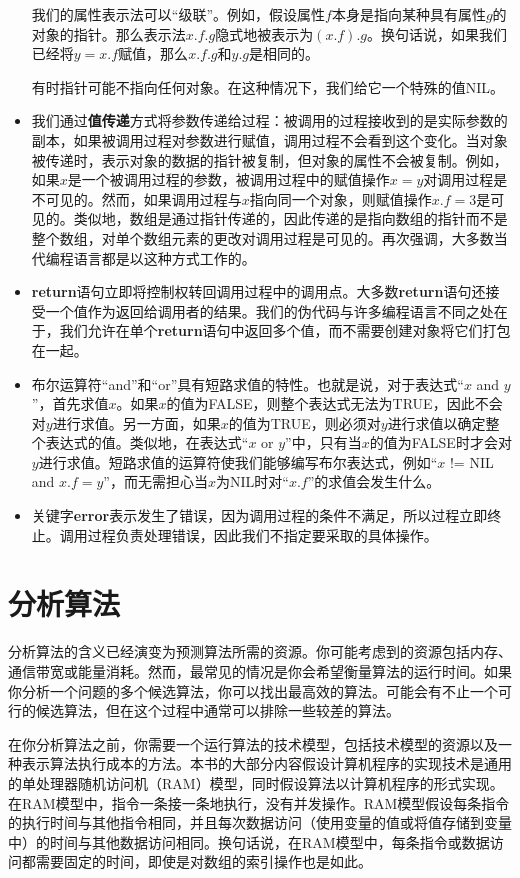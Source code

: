 \documentclass[lang=cn,newtx,10pt,scheme=chinese]{elegantbook}
\begin{document}
\begin{itemize}
    我们的属性表示法可以``级联''。例如，假设属性$f$本身是指向某种具有属性$g$的对象的指针。那么表示法$x.f.g$隐式地被表示为$(x.f).g$。换句话说，如果我们已经将$y = x.f$赋值，那么$x.f.g$和$y.g$是相同的。

    有时指针可能不指向任何对象。在这种情况下，我们给它一个特殊的值NIL。
    \item 我们通过\textbf{值传递}方式将参数传递给过程：被调用的过程接收到的是实际参数的副本，如果被调用过程对参数进行赋值，调用过程不会看到这个变化。当对象被传递时，表示对象的数据的指针被复制，但对象的属性不会被复制。例如，如果$x$是一个被调用过程的参数，被调用过程中的赋值操作$x=y$对调用过程是不可见的。然而，如果调用过程与$x$指向同一个对象，则赋值操作$x.f=3$是可见的。类似地，数组是通过指针传递的，因此传递的是指向数组的指针而不是整个数组，对单个数组元素的更改对调用过程是可见的。再次强调，大多数当代编程语言都是以这种方式工作的。
    \item \textbf{return}语句立即将控制权转回调用过程中的调用点。大多数\textbf{return}语句还接受一个值作为返回给调用者的结果。我们的伪代码与许多编程语言不同之处在于，我们允许在单个\textbf{return}语句中返回多个值，而不需要创建对象将它们打包在一起。
    \item 布尔运算符``and''和``or''具有短路求值的特性。也就是说，对于表达式``$x$ and $y$''，首先求值$x$。如果$x$的值为FALSE，则整个表达式无法为TRUE，因此不会对$y$进行求值。另一方面，如果$x$的值为TRUE，则必须对$y$进行求值以确定整个表达式的值。类似地，在表达式``$x$ or $y$''中，只有当$x$的值为FALSE时才会对$y$进行求值。短路求值的运算符使我们能够编写布尔表达式，例如``$x$ != NIL and $x.f=y$''，而无需担心当$x$为NIL时对``$x.f$''的求值会发生什么。
    \item 关键字\textbf{error}表示发生了错误，因为调用过程的条件不满足，所以过程立即终止。调用过程负责处理错误，因此我们不指定要采取的具体操作。
\end{itemize}

\section{分析算法}\label{section-2.2}

分析算法的含义已经演变为预测算法所需的资源。你可能考虑到的资源包括内存、通信带宽或能量消耗。然而，最常见的情况是你会希望衡量算法的运行时间。如果你分析一个问题的多个候选算法，你可以找出最高效的算法。可能会有不止一个可行的候选算法，但在这个过程中通常可以排除一些较差的算法。

在你分析算法之前，你需要一个运行算法的技术模型，包括技术模型的资源以及一种表示算法执行成本的方法。本书的大部分内容假设计算机程序的实现技术是通用的单处理器随机访问机（RAM）模型，同时假设算法以计算机程序的形式实现。在RAM模型中，指令一条接一条地执行，没有并发操作。RAM模型假设每条指令的执行时间与其他指令相同，并且每次数据访问（使用变量的值或将值存储到变量中）的时间与其他数据访问相同。换句话说，在RAM模型中，每条指令或数据访问都需要固定的时间，即使是对数组的索引操作也是如此。
\end{document}
